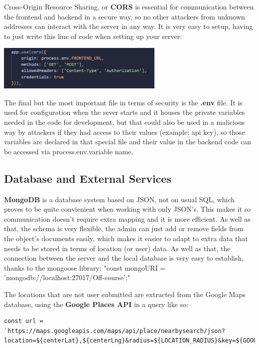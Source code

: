 \documentclass[12pt,a4paper]{report}
\begin{document}
Cross-Origin Resource Sharing, or \textbf{CORS} is essential for communication between the frontend and backend in a secure way, so no other attackers from unknown addresses can interact with the server in any way. It is very easy to setup, having to just write this line of code when setting up your server: 

\begin{center}
\includegraphics[width=0.6\textwidth]{images/cors.png}
\end{center}

The final but the most important file in terms of security is the \textbf{.env} file. It is used for configuration when the sever starts and it houses the private variables needed in the code for development, but that could also be used in a malicious way by attackers if they had access to their values (example: api key), so those variables are declared in that special file and their value in the backend code can be accessed via process.env.variable name.

\subsection{Database and External Services}

\textbf{MongoDB} is a database system based on JSON, not on usual SQL, which proves to be quite convienient when working with only JSON's. This makes it so communication doesn't require extra mapping and it is more efficient. As well as that, the schema is very flexible, the admin can just add or remove fields from the object's documents easily, which makes it easier to adapt to extra data that needs to be stored in terms of location (or user) data. As well as that, the connection between the server and the local database is very easy to establish, thanks to the mongoose library: "const mongoURI = 'mongodb://localhost:27017/Off-course';"

The locations that are not user submitted are extracted from the Google Maps database, using the \textbf{Google Places API} in a query like so:

\begin{lstlisting}
const url = `https://maps.googleapis.com/maps/api/place/nearbysearch/json?location=${centerLat},${centerLng}&radius=${LOCATION_RADIUS}&key=${GOOGLE_MAPS_API_KEY}`;
\end{lstlisting}
\end{document}
